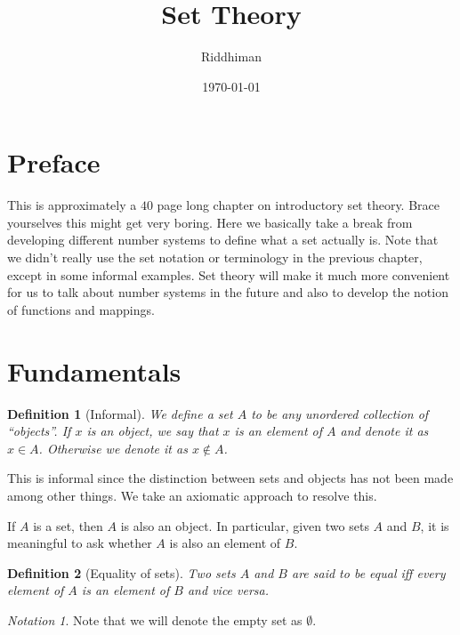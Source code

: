 \documentclass[12pt]{article}
\title{Set Theory}
\author{Riddhiman}
\date{\monthyeardate\today}
\newtheorem{definition}{Definition}[section]
\theoremstyle{remark}
\newtheorem*{notation}{Notation}
\begin{document}
\maketitle

\section{Preface}%
\label{sec:Preface}

This is approximately a $ 40 $ page long chapter on introductory set theory. Brace yourselves this might get very boring. Here we basically take a break from developing different number systems to define what a set actually is. Note that we didn't really use the set notation or terminology in the previous chapter, except in some informal examples. Set theory will make it much more convenient for us to talk about number systems in the future and also to develop the notion of functions and mappings.  

\section{Fundamentals}%
\label{sec:Fundamentals}
 
\begin{definition}[Informal]
	We define a \textit{set} $ A $ to be any unordered collection of ``objects''. If $ x $ is an object, we say that $ x $ \textit{is an element of} $ A $ and denote it as $ x \in A $. Otherwise we denote it as $ x \notin A $.
\end{definition}
 
This is informal since the distinction between sets and objects has not been made among other things. We take an axiomatic approach to resolve this. 


\begin{important}
     If $ A $ is a set, then $ A $ is also an object. In particular, given two sets $ A $ and $ B $, it is meaningful to ask whether $ A $ is also an element of $ B $. 
\end{important}

\begin{definition}[Equality of sets]
    Two sets $ A $ and $ B $ are said to be equal iff every element of $ A $ is an element of $ B $ and vice versa.
\end{definition}

\begin{notation}
    Note that we will denote the empty set as $ \emptyset $.
\end{notation}
\end{document}
